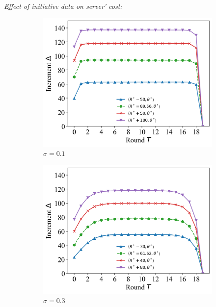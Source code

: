 \documentclass{article}
\theoremstyle{plain}
\theoremstyle{definition}
\theoremstyle{remark}
\begin{document}
\textit{Effect of initiative data on server' cost:}
\begin{figure}
	\begin{subfigure}{0.31\textwidth}
		\centering
    \includegraphics[width=\textwidth]{figures/figure_71_A.png}
    \caption{$\sigma=0.1$}
	\end{subfigure}
  \quad
	\begin{subfigure}{0.31\textwidth}
		\centering
		\includegraphics[width=\textwidth]{figures/figure_71_B.png}
    \caption{$\sigma=0.3$}
	\end{subfigure}
  \quad
  \begin{subfigure}{0.31\textwidth}
		\centering

\end{subfigure}
\end{figure}
\end{document}
